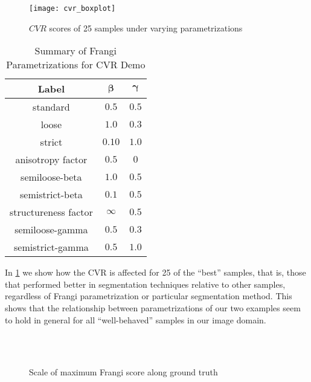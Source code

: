 \begin{figure}[p]\centering
	\texttt{[image: cvr\_boxplot]}
	\caption{$CVR$ scores of 25 samples under varying parametrizations}
  \label{fig:CVR-boxplot-quality0}
\end{figure}

\begin{table}[p]
  	\caption{Summary of Frangi Parametrizations for CVR Demo} 
  \centering
	\begin{tabular}{|c|c|c|}
		\hline
		\textbf{Label}  & $\bm{\beta}$ & $\bm{\gamma}$ \\ \hline
		standard & $0.5$ & $0.5$ \\ \hline
		loose & $ 1.0$ & $0.3$ \\ \hline
		strict & $0.10$ & $1.0$ \\ \hline
		anisotropy factor & $ 0.5$& $0$ \\ \hline
		semiloose-beta &$ 1.0$ & $0.5$ \\ \hline
		semistrict-beta& $ 0.1$ &$ 0.5$ \\ \hline
		structureness factor& $ \infty$ & $0.5$ \\ \hline
		semiloose-gamma &$ 0.5$ & $0.3$ \\ \hline
		semistrict-gamma& $ 0.5$ & $1.0$ \\ \hline
	\end{tabular}

	\label{tab:cvr-demo-parametrizations}
\end{table}

In \cref{fig:CVR-boxplot-quality0} we show how the CVR is affected for 25 of the ``best'' samples, that is, those that performed better in segmentation techniques relative to other samples, regardless of Frangi parametrization or particular segmentation method. This shows that the relationship between parametrizations of our two examples seem to hold in general for all ``well-behaved'' samples in our image domain.

\begin{figure}[p]\centering
	 \\
	 \\
  \caption{Scale of maximum Frangi score along ground truth}
  \label{fig:Vargmax}
\end{figure}


